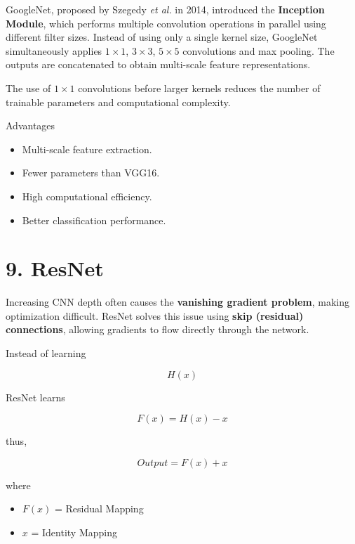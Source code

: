 \documentclass[11pt]{article}
\begin{document}
GoogleNet, proposed by Szegedy \textit{et al.} in 2014, introduced the
\textbf{Inception Module}, which performs multiple convolution operations
in parallel using different filter sizes. Instead of using only a single
kernel size, GoogleNet simultaneously applies $1\times1$, $3\times3$,
$5\times5$ convolutions and max pooling. The outputs are concatenated to
obtain multi-scale feature representations.

The use of $1\times1$ convolutions before larger kernels reduces the
number of trainable parameters and computational complexity.


Advantages

\begin{itemize}
\item Multi-scale feature extraction.
\item Fewer parameters than VGG16.
\item High computational efficiency.
\item Better classification performance.
\end{itemize}


\section*{9. ResNet}

Increasing CNN depth often causes the \textbf{vanishing gradient problem},
making optimization difficult. ResNet solves this issue using
\textbf{skip (residual) connections}, allowing gradients to flow directly
through the network.

Instead of learning

\[
H(x)
\]

ResNet learns

\[
F(x)=H(x)-x
\]

thus,

\[
Output = F(x)+x
\]

where

\begin{itemize}
\item $F(x)$ = Residual Mapping
\item $x$ = Identity Mapping
\end{itemize}
\end{document}
